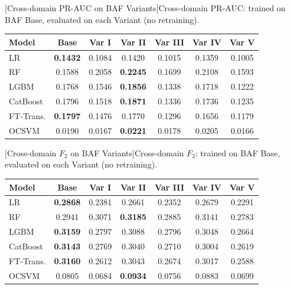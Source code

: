 \noindent\begin{minipage}{\linewidth}\centering
{}[Cross-domain PR-AUC on BAF Variants]{Cross-domain PR-AUC: trained on BAF Base, evaluated on each Variant (no retraining).}
\label{tab:crossdomain_prauc}
\begin{tabular}{l c c c c c c}
\toprule
Model & Base & Var I & Var II & Var III & Var IV & Var V \\
\midrule
LR         & \textbf{0.1432} & 0.1084 & 0.1420 & 0.1015 & 0.1359 & 0.1005 \\
RF         & 0.1588 & 0.2058 & \textbf{0.2245} & 0.1699 & 0.2108 & 0.1593 \\
LGBM       & 0.1768 & 0.1546 & \textbf{0.1856} & 0.1338 & 0.1718 & 0.1222 \\
CatBoost   & 0.1796 & 0.1518 & \textbf{0.1871} & 0.1336 & 0.1736 & 0.1235 \\
FT-Trans.  & \textbf{0.1797} & 0.1476 & 0.1770 & 0.1296 & 0.1656 & 0.1179 \\
OCSVM      & 0.0190 & 0.0167 & \textbf{0.0221} & 0.0178 & 0.0205 & 0.0166 \\
\bottomrule
\end{tabular}
\end{minipage}

\noindent\begin{minipage}{\linewidth}\centering
{}[Cross-domain $F_2$ on BAF Variants]{Cross-domain $F_2$: trained on BAF Base, evaluated on each Variant (no retraining).}
\label{tab:crossdomain_f2}
\begin{tabular}{l c c c c c c}
\toprule
Model & Base & Var I & Var II & Var III & Var IV & Var V \\
\midrule
LR         & \textbf{0.2868} & 0.2381 & 0.2661 & 0.2352 & 0.2679 & 0.2291 \\
RF         & 0.2941 & 0.3071 & \textbf{0.3185} & 0.2885 & 0.3141 & 0.2783 \\
LGBM       & \textbf{0.3159} & 0.2797 & 0.3088 & 0.2796 & 0.3048 & 0.2664 \\
CatBoost   & \textbf{0.3143} & 0.2769 & 0.3040 & 0.2710 & 0.3004 & 0.2619 \\
FT-Trans.  & \textbf{0.3160} & 0.2612 & 0.3043 & 0.2674 & 0.3017 & 0.2588 \\
OCSVM      & 0.0805 & 0.0684 & \textbf{0.0934} & 0.0756 & 0.0883 & 0.0699 \\
\bottomrule
\end{tabular}
\end{minipage}

